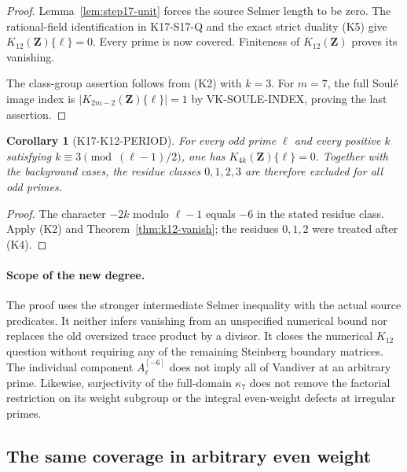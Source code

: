 \documentclass[11pt,a4paper]{article}
\newtheorem{corollary}[theorem]{Corollary}
\theoremstyle{definition}
\begin{document}
\begin{proof}
Lemma~\ref{lem:step17-unit} forces the source Selmer length to be zero.
The rational-field identification in K17-S17-Q and the exact strict
duality (K5) give $K_{12}(\mathbf Z)\{\ell\}=0$. Every prime is now
covered. Finiteness of $K_{12}(\mathbf Z)$ proves its vanishing.

The class-group assertion follows from (K2) with $k=3$.
For $m=7$, the full Soul\'e image index is
$|K_{2m-2}(\mathbf Z)\{\ell\}|=1$ by VK-SOULE-INDEX, proving the
last assertion.
\end{proof}

\begin{corollary}[K17-K12-PERIOD]\label{cor:k12-period}
For every odd prime $\ell$ and every positive $k$ satisfying
$k\equiv3\pmod{(\ell-1)/2}$, one has
$K_{4k}(\mathbf Z)\{\ell\}=0$.
Together with the background cases, the residue classes
$0,1,2,3$ are therefore excluded for all odd primes.
\end{corollary}
\begin{proof}
The character $-2k$ modulo $\ell-1$ equals $-6$ in the stated residue
class. Apply (K2) and Theorem~\ref{thm:k12-vanish}; the residues
$0,1,2$ were treated after (K4).
\end{proof}

\paragraph{Scope of the new degree.}
The proof uses the stronger intermediate Selmer inequality with the
actual source predicates. It neither infers vanishing from an
unspecified numerical bound nor replaces the old oversized trace
product by a divisor. It closes the numerical $K_{12}$ question without
requiring any of the remaining Steinberg boundary matrices.
The individual component $A_\ell^{[-6]}$ does not imply all of Vandiver
at an arbitrary prime. Likewise, surjectivity of the full-domain
$\kappa_7$ does not remove the factorial restriction on its weight
subgroup or the integral even-weight defects at irregular primes.

\subsection{The same coverage in arbitrary even weight}
\label{sec:u3-general-coverage}
\end{document}
